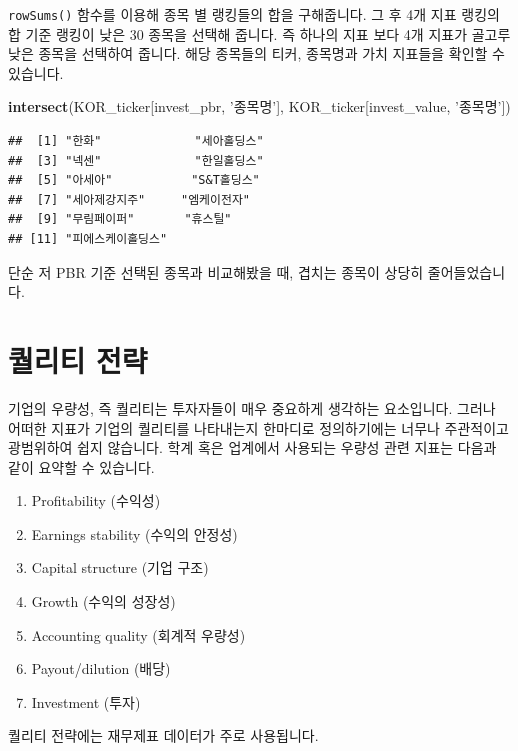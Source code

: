 \documentclass[12pt,]{book}
\newenvironment{Shaded}{\begin{snugshade}}{\end{snugshade}}
\newcommand{\KeywordTok}[1]{\textcolor[rgb]{0.13,0.29,0.53}{\textbf{#1}}}
\newcommand{\NormalTok}[1]{#1}
\newcommand{\StringTok}[1]{\textcolor[rgb]{0.31,0.60,0.02}{#1}}
\providecommand{\tightlist}{%
  \setlength{\itemsep}{0pt}\setlength{\parskip}{0pt}}
\begin{document}
\texttt{rowSums()} 함수를 이용해 종목 별 랭킹들의 합을 구해줍니다. 그 후 4개 지표 랭킹의 합 기준 랭킹이 낮은 30 종목을 선택해 줍니다. 즉 하나의 지표 보다 4개 지표가 골고루 낮은 종목을 선택하여 줍니다. 해당 종목들의 티커, 종목명과 가치 지표들을 확인할 수 있습니다.

\begin{Shaded}
\begin{Highlighting}[]
\KeywordTok{intersect}\NormalTok{(KOR_ticker[invest_pbr, }\StringTok{'종목명'}\NormalTok{],}
\NormalTok{          KOR_ticker[invest_value, }\StringTok{'종목명'}\NormalTok{])}
\end{Highlighting}
\end{Shaded}

\begin{verbatim}
##  [1] "한화"             "세아홀딩스"      
##  [3] "넥센"             "한일홀딩스"      
##  [5] "아세아"           "S&T홀딩스"       
##  [7] "세아제강지주"     "엠케이전자"      
##  [9] "무림페이퍼"       "휴스틸"          
## [11] "피에스케이홀딩스"
\end{verbatim}

단순 저 PBR 기준 선택된 종목과 비교해봤을 때, 겹치는 종목이 상당히 줄어들었습니다.

\hypertarget{section-57}{%
\section{퀄리티 전략}\label{section-57}}

기업의 우량성, 즉 퀄리티는 투자자들이 매우 중요하게 생각하는 요소입니다. 그러나 어떠한 지표가 기업의 퀄리티를 나타내는지 한마디로 정의하기에는 너무나 주관적이고 광범위하여 쉽지 않습니다. 학계 혹은 업계에서 사용되는 우량성 관련 지표는 다음과 같이 요약할 수 있습니다.

\begin{enumerate}
\def\labelenumi{\arabic{enumi}.}
\tightlist
\item
  Profitability (수익성)
\item
  Earnings stability (수익의 안정성)
\item
  Capital structure (기업 구조)
\item
  Growth (수익의 성장성)
\item
  Accounting quality (회계적 우량성)
\item
  Payout/dilution (배당)
\item
  Investment (투자)
\end{enumerate}

퀄리티 전략에는 재무제표 데이터가 주로 사용됩니다.
\end{document}
